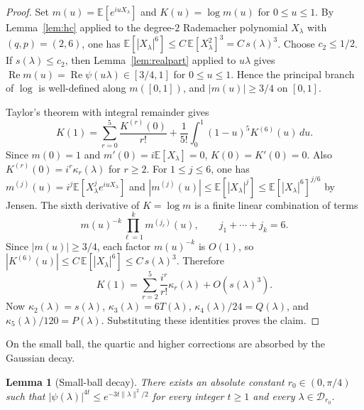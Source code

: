 \documentclass[11pt]{article}
\newtheorem{lemma}[theorem]{Lemma}
\theoremstyle{definition}
\newcommand{\E}{\mathbb{E}}
\newcommand{\Dd}{\mathcal{D}}
\newcommand{\RePart}{\operatorname{Re}}
\begin{document}
\begin{proof}
Set \(m(u)=\E[e^{iuX_\lambda}]\) and \(K(u)=\log m(u)\) for \(0\le u\le 1\).
By Lemma~\ref{lem:hc} applied to the degree-\(2\) Rademacher polynomial \(X_\lambda\)
with \((q,p)=(2,6)\), one has \(\E[|X_\lambda|^6]\le C\,\E[X_\lambda^2]^3=C\,s(\lambda)^3\).
Choose \(c_2\le 1/2\). If \(s(\lambda)\le c_2\), then Lemma~\ref{lem:realpart} applied to \(u\lambda\) gives
\(\RePart m(u)=\RePart\psi(u\lambda)\in[3/4,1]\) for \(0\le u\le 1\).
Hence the principal branch of \(\log\) is well-defined along \(m([0,1])\), and \(|m(u)|\ge 3/4\) on \([0,1]\).

Taylor's theorem with integral remainder gives
\[
  K(1)=\sum_{r=0}^5\frac{K^{(r)}(0)}{r!}+\frac1{5!}\int_0^1(1-u)^5K^{(6)}(u)\,du.
\]
Since \(m(0)=1\) and \(m'(0)=i\E[X_\lambda]=0\),
\(K(0)=K'(0)=0\). Also \(K^{(r)}(0)=i^r\kappa_r(\lambda)\) for \(r\ge 2\). For
\(1\le j\le 6\), one has \(m^{(j)}(u)=i^j\E[X_\lambda^j e^{iuX_\lambda}]\) and
\(|m^{(j)}(u)|\le \E[|X_\lambda|^j]\le \E[|X_\lambda|^6]^{j/6}\) by Jensen.
The sixth derivative of \(K=\log m\) is a finite linear combination of terms
\[
  m(u)^{-k}\prod_{\ell=1}^k m^{(j_\ell)}(u),
  \qquad
  j_1+\cdots+j_k=6.
\]
Since \(|m(u)|\ge 3/4\), each factor \(m(u)^{-k}\) is \(O(1)\), so \(|K^{(6)}(u)|\le C\,\E[|X_\lambda|^6]\le C\,s(\lambda)^3\).
Therefore
\[
  K(1)=\sum_{r=2}^5\frac{i^r}{r!}\kappa_r(\lambda)+O(s(\lambda)^3).
\]
Now \(\kappa_2(\lambda)=s(\lambda)\), \(\kappa_3(\lambda)=6T(\lambda)\),
\(\kappa_4(\lambda)/24=Q(\lambda)\), and \(\kappa_5(\lambda)/120=P(\lambda)\). Substituting these identities proves the claim.
\end{proof}

On the small ball, the quartic and higher corrections are absorbed by the Gaussian decay.

\begin{lemma}[Small-ball decay]\label{lem:small-ball}
There exists an absolute constant \(r_0\in(0,\pi/4)\) such that
\(|\psi(\lambda)|^{4t}\le e^{-3t\|\lambda\|^2/2}\) for every integer \(t\ge 1\)
and every \(\lambda\in\Dd_{r_0}\).
\end{lemma}
\end{document}
